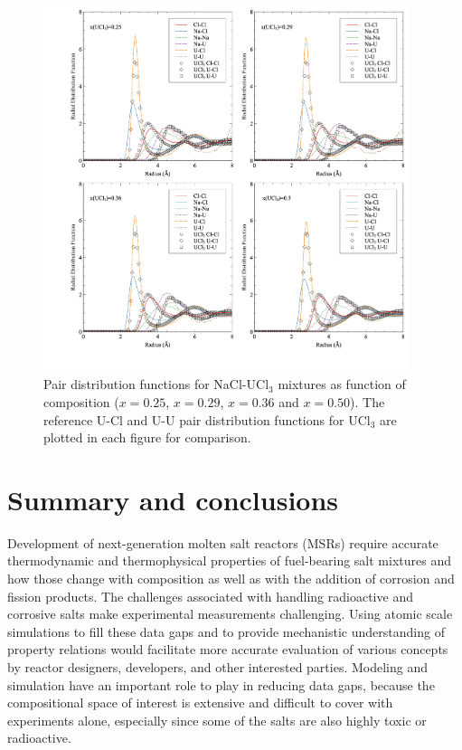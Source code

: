\documentclass[preprint,3p,10pt,onecolumn,number,sort&compress]{elsarticle}
\begin{document}
{ \begin{figure}[htb]
\centering
\includegraphics[width=0.95\textwidth]{fig14.jpg}
\caption{Pair distribution functions for NaCl-UCl$_3$ mixtures as function of composition ($x=0.25$, $x=0.29$, $x=0.36$ and $x=0.50$). The reference U-Cl and U-U pair distribution functions for UCl$_3$ are plotted in each figure for comparison.} 
\label{fig:fig_pair}
\end{figure}

\FloatBarrier

\section{Summary and conclusions}
\label{sec:conclusions}
Development of next-generation molten salt reactors (MSRs) require accurate thermodynamic and thermophysical properties of fuel-bearing salt mixtures and how those change with composition as well as with the addition of corrosion and fission products. The challenges associated with handling radioactive and corrosive salts make experimental measurements challenging. Using atomic scale simulations to fill these data gaps and to provide mechanistic understanding of property relations would facilitate more accurate evaluation of various concepts by reactor designers, developers, and other interested parties. Modeling and simulation have an important role to play in reducing data gaps, because the compositional space of interest is extensive and difficult to cover with experiments alone, especially since some of the salts are also highly toxic or radioactive. 

}
\end{document}
